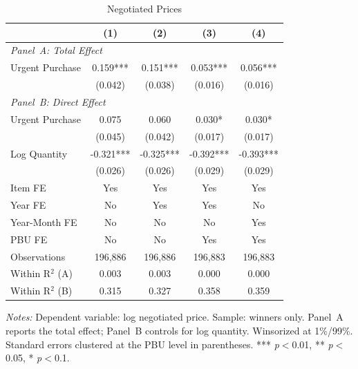 \begin{table}[ht]
  \centering
  \caption{Negotiated Prices}
  \label{tab:neg_prices}
  \small
  \begin{threeparttable}
  \begin{tabular}{lcccc}
    \hline\hline
    & (1) & (2) & (3) & (4) \\
    \hline
    \multicolumn{5}{l}{\textit{Panel~A: Total Effect}} \\[3pt]
    Urgent Purchase & 0.159*** & 0.151*** & 0.053*** & 0.056*** \\
     & (0.042) & (0.038) & (0.016) & (0.016) \\[3pt]
    \hline
    \multicolumn{5}{l}{\textit{Panel~B: Direct Effect}} \\[3pt]
    Urgent Purchase & 0.075 & 0.060 & 0.030* & 0.030* \\
     & (0.045) & (0.042) & (0.017) & (0.017) \\[3pt]
    Log Quantity & -0.321*** & -0.325*** & -0.392*** & -0.393*** \\
     & (0.026) & (0.026) & (0.029) & (0.029) \\[3pt]
    \hline
    Item FE & Yes & Yes & Yes & Yes \\
    Year FE & No & Yes & Yes & No \\
    Year-Month FE & No & No & No & Yes \\
    PBU FE & No & No & Yes & Yes \\
    Observations & 196,886 & 196,886 & 196,883 & 196,883 \\
    Within R$^2$ (A) & 0.003 & 0.003 & 0.000 & 0.000 \\
    Within R$^2$ (B) & 0.315 & 0.327 & 0.358 & 0.359 \\
    \hline\hline
  \end{tabular}
  \begin{tablenotes}
    \small
    \item \textit{Notes:} Dependent variable: log negotiated price. Sample: winners only. Panel~A reports the total effect; Panel~B controls for log quantity. Winsorized at 1\%/99\%. Standard errors clustered at the PBU level in parentheses. *** \textit{p}$<$0.01, ** \textit{p}$<$0.05, * \textit{p}$<$0.1.
  \end{tablenotes}
  \end{threeparttable}
\end{table}
